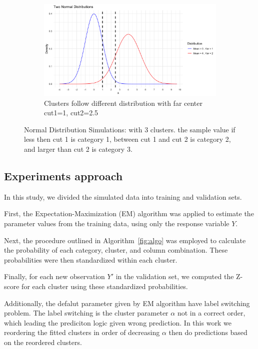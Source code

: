 \documentclass{article}
\begin{document}
\begin{figure}[ht]
\begin{subfigure}{0.32\textwidth}
      \centering
      \includegraphics[width=\textwidth]{images/dist_simu/nor_far.png} %
      \caption{Clusters follow different distribution with far center\\ cut1=1, cut2=2.5}
  \end{subfigure}
  
  \caption{Normal Distribution Simulations: with 3 clusters. the sample value if less then cut 1 is category 1, between cut 1 and cut 2 is category 2, and larger than cut 2 is category 3.}
  \label{fig:dist_sim}
\end{figure}


\subsection{Experiments approach}

In this study, we divided the simulated data into training and validation sets.

First, the Expectation-Maximization (EM) algorithm was applied to estimate the parameter values from the training data, using only the response variable $Y$.

Next, the procedure outlined in Algorithm~\ref{fig:algo} was employed to calculate the probability of each category, cluster, and column combination. 
These probabilities were then standardized within each cluster.

Finally, for each new observation $Y'$ in the validation set, we computed the Z-score for each cluster using these standardized probabilities.

Additionally, the defalut parameter given by EM algorithm have label switching problem.
The label switching is the cluster parameter $\alpha$ not in a correct order, which leading the prediciton logic given wrong prediction.
In this work we reordering the fitted clusters in order of decreasing $\alpha$ then do predictions based on the reordered clusters.
\end{document}
